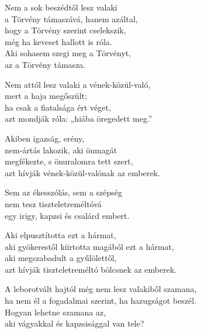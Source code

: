 \begin{dhpverse}

 Nem a sok beszédtől lesz valaki\\
a Törvény támaszává, hanem azáltal,\\
hogy a Törvény szerint cselekszik,\\
még ha keveset hallott is róla.\\
Aki sohasem szegi meg a Törvényt,\\
az a Törvény támasza.

 Nem attól lesz valaki a vének-közül-való,\\
mert a haja megőszült;\\
ha csak a fiatalsága ért véget,\\
azt mondják róla: „hiába öregedett meg.”

 Akiben igazság, erény,\\
nem-ártás lakozik, aki önmagát\\
megfékezte, s önuralomra tett szert,\\
azt hívják vének-közül-valónak az emberek.

 Sem az ékesszólás, sem a szépség\\
nem tesz tiszteletreméltóvá\\
egy irigy, kapzsi és csalárd embert.

 Aki elpusztította ezt a hármat,\\
aki gyökerestől kiirtotta magából ezt a hármat,\\
aki megszabadult a gyűlölettől,\\
azt hívják tiszteletreméltó bölcsnek az emberek.

 A leborotvált hajtól még nem lesz valakiből szamana,\\
ha nem él a fogadalmai szerint, ha hazugságot beszél.\\
Hogyan lehetne szamana az,\\
aki vágyakkal és kapzsisággal van tele?

\end{dhpverse}
\newpage
